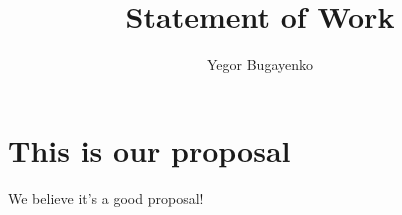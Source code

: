 \documentclass{../../huawei}
\title{Statement of Work}
\author{Yegor Bugayenko}
\begin{document}
\section*{This is our proposal}

We believe it's a good proposal!
\end{document}
